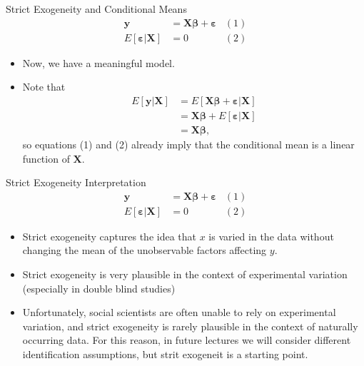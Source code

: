 \begin{frame}{Strict Exogeneity and Conditional Means}
\begin{align*}
\boldsymbol{y} & =  \boldsymbol{X}\boldsymbol{\beta}+\boldsymbol{\varepsilon}	& (1)\\
E\left[\boldsymbol{\varepsilon}|\boldsymbol{X}\right] & =  0						& (2)
\end{align*}
\begin{itemize}
	\item Now, we have a meaningful model. 
	\item Note that
\begin{align*}
E\left[\boldsymbol{y}|\boldsymbol{X}\right] & =  E\left[\boldsymbol{X}\boldsymbol{\beta}+\boldsymbol{\varepsilon}|\boldsymbol{X}\right]\\
 & =  \boldsymbol{X}\boldsymbol{\beta}+E\left[\boldsymbol{\varepsilon}|\boldsymbol{X}\right]\\
 &  = \boldsymbol{X}\boldsymbol{\beta},
\end{align*}
so equations (1) and (2) already imply that the conditional mean is a linear function of $\boldsymbol{X}$.
\end{itemize}
\end{frame}

\begin{frame}{Strict Exogeneity Interpretation}
\begin{align*}
\boldsymbol{y} & =  \boldsymbol{X}\boldsymbol{\beta}+\boldsymbol{\varepsilon}	& (1)\\
E\left[\boldsymbol{\varepsilon}|\boldsymbol{X}\right] & =  0						& (2)
\end{align*}
\begin{itemize}
	\item Strict exogeneity captures the idea that $x$ is varied in the data without changing the mean
	of the unobservable factors affecting $y$. 

	\medskip
	\item Strict exogeneity is very plausible in the context of experimental variation (especially in double blind studies) 

	\medskip
	\item Unfortunately, social scientists are often unable to rely on experimental variation, and strict exogeneity 
	is rarely plausible in the context of naturally occurring data. For this reason, in future lectures we will consider
	different identification assumptions, but strit exogeneit is a starting point. 
\end{itemize}
\end{frame}


